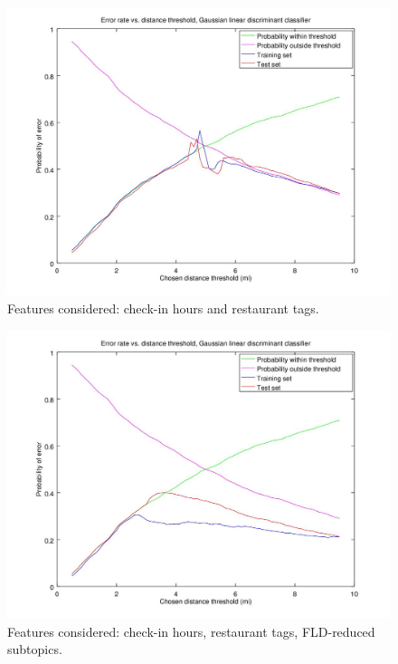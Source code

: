 \documentclass[10pt,twocolumn,letterpaper]{article}
\begin{document}
\begin{figure}[h]
  \centering{}\includegraphics[width=1\linewidth]{filtered_colleges_no_subtopics/fisher_LDA_error_v_threshold}
  \caption{Features considered: check-in hours and restaurant tags.}
\label{fld_bdr_error_v_threshold_no_subtopics}
\end{figure}
\begin{figure}[h]
  \centering{}\includegraphics[width=1\linewidth]{filtered_colleges_yes_subtopics/fisher_LDA_error_v_threshold}
  \caption{Features considered: check-in hours, restaurant tags, FLD-reduced
  subtopics.}
\label{fld_bdr_error_v_threshold_yes_subtopics}
\end{figure}
\end{document}

